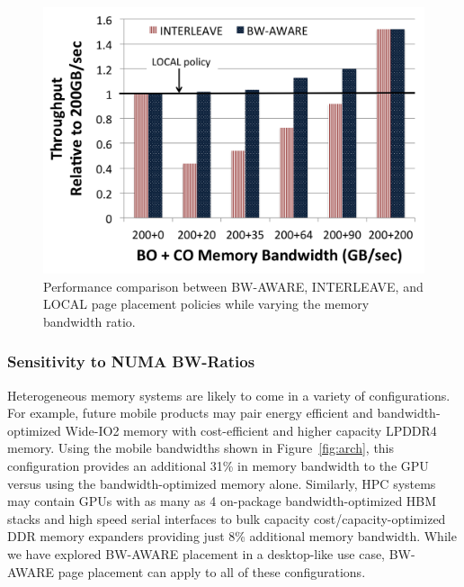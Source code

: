 \begin{figure}[t]
    \centering
    \includegraphics[width=0.9\columnwidth]{asplos2015/figures/sensitivitytobwratio.png}
    \caption{Performance comparison between BW-AWARE, INTERLEAVE, and LOCAL page placement
policies while varying the memory bandwidth ratio.}
    \label{fig:sensitivitytobwratio}
\end{figure}

\subsubsection{Sensitivity to NUMA BW-Ratios\\} 
Heterogeneous memory systems are likely to come in a variety of configurations.
For example, future mobile products may pair energy efficient
and bandwidth-optimized Wide-IO2 memory with cost-efficient and higher capacity
LPDDR4 memory.  Using the mobile bandwidths shown in Figure~\ref{fig:arch},
{\color{black}this configuration} provides
an additional 31\% in memory bandwidth to the GPU versus using the bandwidth-optimized memory alone. 
Similarly, HPC systems may contain GPUs with as many as 4 on-package
bandwidth-optimized HBM stacks and 
high speed serial interfaces to bulk capacity cost/capacity-optimized DDR memory expanders
providing just 8\% additional memory bandwidth.  While we have explored BW-AWARE
placement in a desktop-like use case, BW-AWARE page placement can apply 
to all of these configurations.  

